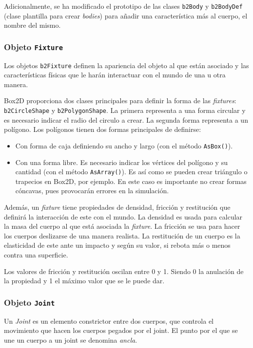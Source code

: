 Adicionalmente, se ha modificado el prototipo de las clases \texttt{b2Body} y \texttt{b2BodyDef} (clase plantilla para crear \emph{bodies}) para añadir una característica más al cuerpo, el nombre del mismo.


\subsubsection*{Objeto \texttt{Fixture}}

Los objetos \texttt{b2Fixture} definen la apariencia del objeto al que están asociado y las características físicas que le harán interactuar con el mundo de una u otra manera.

Box2D proporciona dos clases principales para definir la forma de las \emph{fixtures}: \texttt{b2CircleShape} y \texttt{b2PolygonShape}. La primera representa a una forma circular y es necesario indicar el radio del circulo a crear. La segunda forma representa a un polígono. Los polígonos tienen dos formas principales de definirse:

\begin{itemize}
	\item Con forma de caja definiendo su ancho y largo (con el método \texttt{AsBox()}).
	\item Con una forma libre. Es necesario indicar los vértices del polígono y su cantidad (con el método \texttt{AsArray()}). Es así como se pueden crear triángulo o trapecios en Box2D, por ejemplo. En este caso es importante no crear formas cóncavas, pues provocarán errores en la simulación.
\end{itemize}


Además, un \emph{fixture} tiene propiedades de densidad, fricción y restitución que definirá la interacción de este con el mundo. La densidad es usada para calcular la masa del cuerpo al que está asociada la \emph{fixture}. La fricción se usa para hacer los cuerpos deslizarse de una manera realista. La restitución de un cuerpo es la elasticidad de este ante un impacto y según su valor, si rebota más o menos contra una superficie. 

Los valores de fricción y restitución oscilan entre 0 y 1. Siendo 0 la anulación de la propiedad y 1 el máximo valor que se le puede dar.


\subsubsection*{Objeto \texttt{Joint}}


Un \emph{Joint} es un elemento constrictor entre dos cuerpos, que controla el movimiento que hacen los cuerpos pegados por el joint. El punto por el que se une un cuerpo a un joint se denomina \emph{ancla}.

